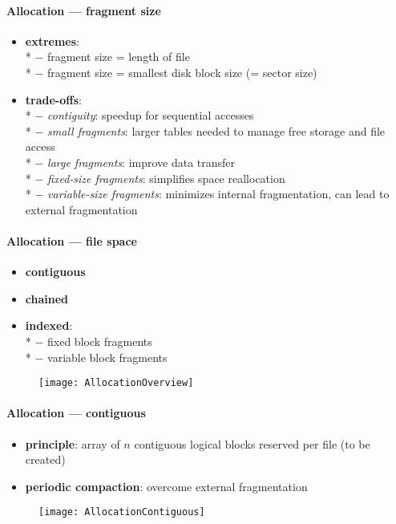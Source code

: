 \paragraph{Allocation --- fragment size}
\begin{itemize}
  \item \textbf{extremes}: \\*
    $ - $ fragment size = length of file \\*
    $ - $ fragment size = smallest disk block size (= sector size)
  \item \textbf{trade-offs}: \\*
    $ - $ \emph{contiguity}: speedup for sequential accesses \\*
    $ - $ \emph{small fragments}: larger tables needed to manage free storage and file access \\*
    $ - $ \emph{large fragments}: improve data transfer \\*
    $ - $ \emph{fixed-size fragments}: simplifies space reallocation \\*
    $ - $ \emph{variable-size fragments}: minimizes internal fragmentation, can lead to external fragmentation
\end{itemize}

\paragraph{Allocation --- file space}
\begin{itemize}
  \item \textbf{contiguous}
  \item \textbf{chained}
  \item \textbf{indexed}: \\*
    $ - $ fixed block fragments \\*
    $ - $ variable block fragments
\end{itemize}
\begin{figure}[h]\centering\label{AllocationOverview}\texttt{[image: AllocationOverview]}\end{figure}

\paragraph{Allocation --- contiguous}
\begin{itemize}
  \item \textbf{principle}: array of $ n $ contiguous logical blocks reserved per file (to be created)
  \item \textbf{periodic compaction}: overcome external fragmentation
\end{itemize}
\begin{figure}[h]\centering\label{AllocationContiguous}\texttt{[image: AllocationContiguous]}\end{figure}

